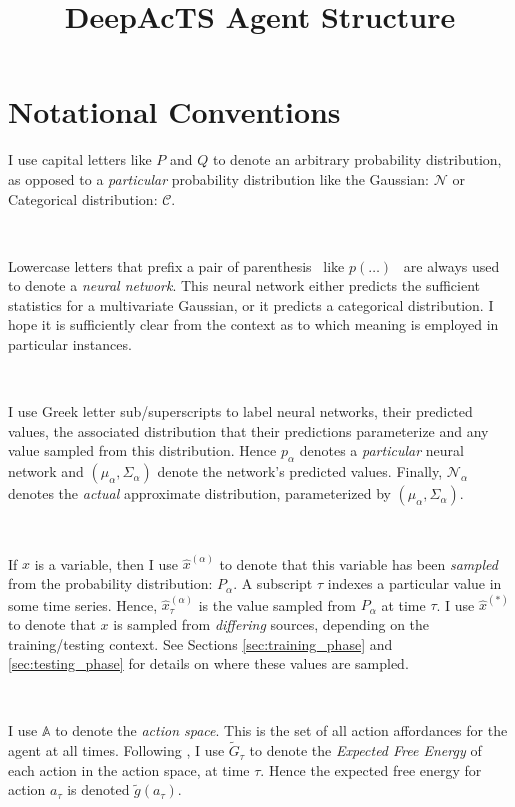 \documentclass{article}
\title{DeepAcTS Agent Structure}
\begin{document}
\maketitle

\section{Notational Conventions}
I use capital letters like $P$  and $Q$ to denote an arbitrary probability distribution, as opposed to a \textit{particular} probability distribution like the Gaussian: $\mathcal{N}$ or Categorical distribution: $\mathcal{C}$. 

\

Lowercase letters that prefix a pair of parenthesis \textemdash \ like $p(\hdots)$ \textemdash \ are always used to denote a \textit{neural network}. This neural network either predicts the sufficient statistics for a multivariate Gaussian, or it predicts a categorical distribution. I hope it is sufficiently clear from the context as to which meaning is employed in particular instances. 

\

I use Greek letter sub/superscripts to label neural networks, their predicted values, the associated distribution that their predictions parameterize and any value sampled from this distribution. Hence $p_{\alpha}$ denotes a \textit{particular} neural network and $(\mu_{\alpha}, \Sigma_{\alpha})$ denote the network's predicted values. Finally, $\mathcal{N}_{\alpha}$ denotes the \textit{actual} approximate distribution, parameterized by $(\mu_{\alpha}, \Sigma_{\alpha})$.

\

If $x$ is a variable, then I use $\hat{x}^{(\alpha)}$ to denote that this variable has been \textit{sampled} from the probability distribution: $P_{\alpha}$. A subscript $\tau$ indexes a particular value in some time series. Hence, $\hat{x}_{\tau}^{(\alpha)}$ is the value sampled from $P_{\alpha}$ at time $\tau$. I use $\hat{x}^{(*)}$ to denote that $x$ is sampled from \textit{differing} sources, depending on the training/testing context. See Sections \ref{sec:training_phase} and \ref{sec:testing_phase} for details on where these values are sampled.

\

I use $\mathbb{A}$ to denote the \textit{action space}. This is the set of all action affordances for the agent at all times. Following \cite{DEEP-AIF-For-POMDPs}, I use $\tilde{G}_{\tau}$ to denote the \textit{Expected Free Energy} of each action in the action space, at time $\tau$. Hence the expected free energy for action $a_{\tau}$ is denoted $\tilde{g}(a_{\tau})$. 
\end{document}
